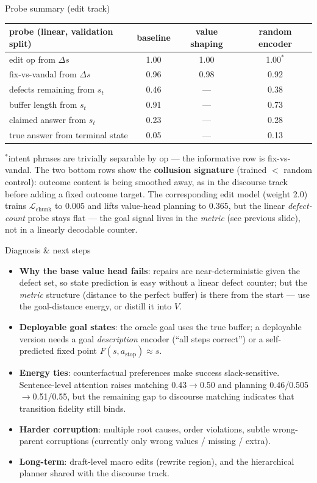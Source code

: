 \documentclass[aspectratio=169,10pt]{beamer}
\begin{document}
\begin{frame}{Probe summary (edit track)}
\centering\small
\begin{tabular}{lccc}
\toprule
probe (linear, validation split) & baseline & value shaping & random encoder\\
\midrule
edit op from $\Delta s$ & 1.00 & 1.00 & 1.00$^*$\\
fix-vs-vandal from $\Delta s$ & 0.96 & 0.98 & 0.92\\
defects remaining from $s_t$ & 0.46 & --- & 0.38\\
buffer length from $s_t$ & 0.91 & --- & 0.73\\
claimed answer from $s_t$ & 0.23 & --- & 0.28\\
true answer from terminal state & 0.05 & --- & 0.13\\
\bottomrule
\end{tabular}

\medskip\small
$^*$intent phrases are trivially separable by op --- the informative row is
fix-vs-vandal. The two bottom rows show the \textbf{collusion signature}
(trained $<$ random control): outcome content is being smoothed away, as in
the discourse track before adding a fixed outcome target. The corresponding
edit model (weight 2.0) trains $\mathcal L_{\text{chunk}}$ to 0.005 and lifts
value-head planning to 0.365, but the linear \emph{defect-count} probe stays
flat --- the goal signal lives in the \emph{metric} (see previous slide),
not in a linearly decodable counter.
\end{frame}

\begin{frame}{Diagnosis \& next steps}
\begin{itemize}\itemsep2pt
  \item \textbf{Why the base value head fails}: repairs are
        near-deterministic given the defect set, so state prediction is easy
        without a linear defect counter; but the \emph{metric} structure
        (distance to the perfect buffer) is there from the start --- use the
        goal-distance energy, or distill it into $V$.
  \item \textbf{Deployable goal states}: the oracle goal uses the true
        buffer; a deployable version needs a goal \emph{description} encoder
        (``all steps correct'') or a self-predicted fixed point
        $F(s,a_{\text{stop}}) \approx s$.
  \item \textbf{Energy ties}: counterfactual preferences make success
        slack-sensitive. Sentence-level attention raises matching
        0.43$\to$0.50 and planning 0.46/0.505$\to$0.51/0.55, but the remaining
        gap to discourse matching indicates that transition fidelity still binds.
  \item \textbf{Harder corruption}: multiple root causes, order violations,
        subtle wrong-parent corruptions (currently only wrong values /
        missing / extra).
  \item \textbf{Long-term}: draft-level macro edits (rewrite region), and the
        hierarchical planner shared with the discourse track.
\end{itemize}
\end{frame}
\end{document}
